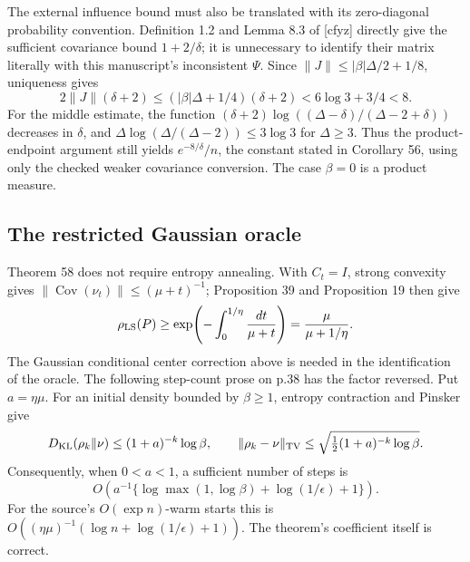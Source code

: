 \documentclass[10pt]{article}
\begin{document}
The external influence bound must also be translated with its zero-diagonal probability convention. Definition 1.2 and Lemma 8.3 of [cfyz] directly give the sufficient covariance bound \(1+2/\delta\); it is unnecessary to identify their matrix literally with this manuscript’s inconsistent \(\Psi\). Since \(\|J\|\le|\beta|\Delta/2+1/8\), uniqueness gives \[2\|J\|(\delta+2)
 \le (|\beta|\Delta+1/4)(\delta+2)
 <6\log3+3/4<8.\] For the middle estimate, the function \((\delta+2)\log((\Delta-\delta)/(\Delta-2+\delta))\) decreases in \(\delta\), and \(\Delta\log(\Delta/(\Delta-2))\le3\log3\) for \(\Delta\ge3\). Thus the product-endpoint argument still yields \(e^{-8/\delta}/n\), the constant stated in Corollary 56, using only the checked weaker covariance conversion. The case \(\beta=0\) is a product measure.\par
\subsection*{The restricted Gaussian oracle}
Theorem 58 does not require entropy annealing. With \(C_t=I\), strong convexity gives \(\|\operatorname{Cov}(\nu_t)\|\le(\mu+t)^{-1}\); Proposition 39 and Proposition 19 then give \[\rho_{\rm LS}(P)\ge
   \exp\!\left(-\int_0^{1/\eta}\frac{dt}{\mu+t}\right)
   =\frac{\mu}{\mu+1/\eta}.\] The Gaussian conditional center correction above is needed in the identification of the oracle. The following step-count prose on p.38 has the factor reversed. Put \(a=\eta\mu\). For an initial density bounded by \(\beta\ge1\), entropy contraction and Pinsker give \[D_{\mathrm{KL}}(\rho_k\Vert\nu)\le(1+a)^{-k}\log\beta,\qquad
 \|\rho_k-\nu\|_{\rm TV}
 \le\sqrt{\tfrac12(1+a)^{-k}\log\beta}.\] Consequently, when \(0<a<1\), a sufficient number of steps is \[O\!\left(a^{-1}
 \{\log\max(1,\log\beta)+\log(1/\epsilon)+1\}\right).\] For the source’s \(O(\exp n)\)-warm starts this is \(O((\eta\mu)^{-1}(\log n+\log(1/\epsilon)+1))\). The theorem’s coefficient itself is correct.\par
\end{document}
